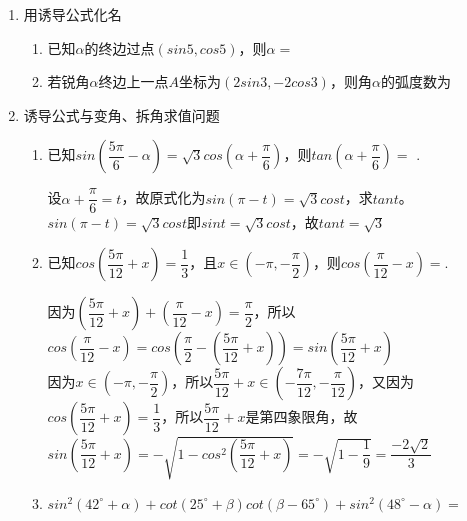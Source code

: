 \begin{enumerate}
\begin{enumerate}
\begin{jieda}
        \end{jieda}
        \item 设$a, b$是非零实数，且满足$\dfrac{asin\dfrac{\pi}{5} - bcos\dfrac{\pi}{5}}{acos\dfrac{\pi}{5}+bsin\dfrac{\pi}{5}} = tan\dfrac{11\pi}{30}$，则$\dfrac{b}{a} = $
    \end{enumerate}
    \item 用诱导公式化名
    \begin{enumerate}
        \item 已知$\alpha$的终边过点$(sin5, cos5)$，则$\alpha = $
        \item 若锐角$\alpha$终边上一点$A$坐标为$(2sin3, -2cos3)$，则角$\alpha$的弧度数为
    \end{enumerate}
    \item 诱导公式与变角、拆角求值问题
    \begin{enumerate}
        \item 已知$sin(\dfrac{5\pi}{6} - \alpha) = \sqrt{3}cos(\alpha + \dfrac{\pi}{6})$，则$tan(\alpha + \dfrac{\pi}{6}) = $ .
        \begin{jieda}
            设$\alpha + \dfrac{\pi}{6} = t$，故原式化为$sin(\pi - t) = \sqrt{3}cost$，求$tant$。\\
    $sin(\pi - t) = \sqrt{3}cost$即$sint = \sqrt{3}cost$，故$tant = \sqrt{3}$
        \end{jieda}
        \item 已知$cos(\dfrac{5\pi}{12}+x) = \dfrac{1}{3}$，且$x \in (-\pi, -\dfrac{\pi}{2})$，则$cos(\dfrac{\pi}{12} - x) = $.
        \begin{jieda}
            因为$(\dfrac{5\pi}{12}+x) + (\dfrac{\pi}{12} - x) = \dfrac{\pi}{2}$，所以$cos(\dfrac{\pi}{12} - x) = cos(\dfrac{\pi}{2} - (\dfrac{5\pi}{12}+x)) = sin(\dfrac{5\pi}{12}+x)$ \\
            因为$x \in (-\pi, -\dfrac{\pi}{2})$，所以$\dfrac{5\pi}{12}+x \in (-\dfrac{7\pi}{12}, -\dfrac{\pi}{12})$，又因为$cos(\dfrac{5\pi}{12}+x) = \dfrac{1}{3}$，所以$\dfrac{5\pi}{12}+x$是第四象限角，故$sin(\dfrac{5\pi}{12}+x) = -\sqrt{1 - cos^2(\dfrac{5\pi}{12}+x)} = -\sqrt{1 - \dfrac{1}{9}} = \dfrac{-2\sqrt{2}}{3}$
        \end{jieda}
        \item $sin^2(42^{\circ} + \alpha) + cot(25^{\circ} + \beta)cot(\beta-65^{\circ}) + sin^2(48^{\circ}-\alpha) = $
        \begin{jieda}

\end{jieda}
\end{enumerate}
\end{enumerate}
